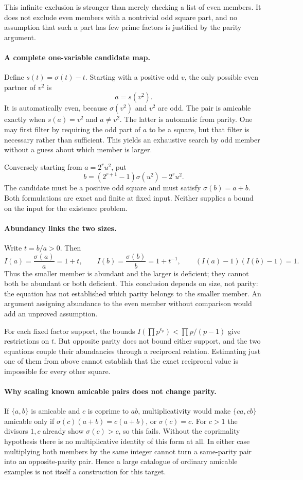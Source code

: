 \documentclass[11pt,a4paper]{article}
\begin{document}
This infinite exclusion is stronger than merely checking a list of
even members. It does not exclude even members with a nontrivial odd
square part, and no assumption that such a part has few prime factors
is justified by the parity argument.

\paragraph{A complete one-variable candidate map.}
Define $s(t)=\sigma(t)-t$. Starting with a positive odd $v$, the only
possible even partner of $v^2$ is
\[
                         a=s(v^2).
\]
It is automatically even, because $\sigma(v^2)$ and $v^2$ are odd.
The pair is amicable exactly when $s(a)=v^2$ and $a\ne v^2$.
The latter is automatic from parity. One may first filter by requiring
the odd part of $a$ to be a square, but that filter is necessary rather
than sufficient. This yields an exhaustive search by odd member without
a guess about which member is larger.

Conversely starting from $a=2^r u^2$, put
\[
 b=(2^{r+1}-1)\sigma(u^2)-2^r u^2.
\]
The candidate must be a positive odd square and must satisfy
$\sigma(b)=a+b$. Both formulations are exact and finite at fixed
input. Neither supplies a bound on the input for the existence problem.

\paragraph{Abundancy links the two sizes.}
Write $t=b/a>0$. Then
\[
 I(a)=\frac{\sigma(a)}a=1+t,\qquad
 I(b)=\frac{\sigma(b)}b=1+t^{-1},
 \qquad (I(a)-1)(I(b)-1)=1.
\]
Thus the smaller member is abundant and the larger is deficient;
they cannot both be abundant or both deficient. This conclusion
depends on size, not parity: the equation has not established which
parity belongs to the smaller member. An argument assigning abundance
to the even member without comparison would add an unproved assumption.

For each fixed factor support, the bounds
$I(\prod p^{e_p})<\prod p/(p-1)$ give restrictions on $t$.
But opposite parity does not bound either support, and the two equations
couple their abundancies through a reciprocal relation. Estimating just
one of them from above cannot establish that the exact reciprocal value
is impossible for every other square.

\paragraph{Why scaling known amicable pairs does not change parity.}
If $\{a,b\}$ is amicable and $c$ is coprime to $ab$, multiplicativity
would make $\{ca,cb\}$ amicable only if
$\sigma(c)(a+b)=c(a+b)$, or $\sigma(c)=c$. For $c>1$ the divisors
$1,c$ already show $\sigma(c)>c$, so this fails. Without the
coprimality hypothesis there is no multiplicative identity of this
form at all. In either case multiplying both members by the same
integer cannot turn a same-parity pair into an opposite-parity pair.
Hence a large catalogue of ordinary amicable examples is not itself
a construction for this target.
\end{document}
